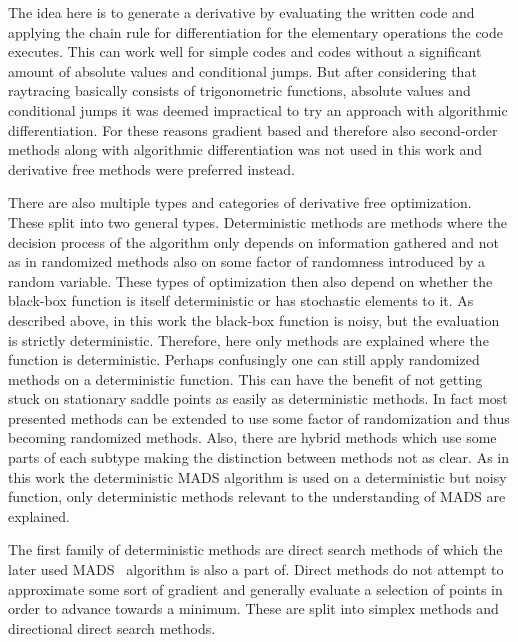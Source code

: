 \documentclass[a4paper,10pt]{article}
\begin{document}
    The idea here is to generate a derivative by evaluating the
    written code and applying the chain rule for differentiation
    for the elementary operations the code executes.
    This can work well for simple codes and codes without a
    significant amount of absolute values and conditional jumps.
    But after considering that raytracing basically consists of
    trigonometric functions, absolute values and conditional jumps
    it was deemed impractical to try an approach with algorithmic
    differentiation.
    For these reasons gradient based and therefore also second-order
    methods along with algorithmic differentiation was not used in
    this work and derivative free methods were preferred instead.

    There are also multiple types and categories of derivative
    free optimization.
    These split into two general types.
    Deterministic methods are methods where the decision process of
    the algorithm only depends on information gathered and not
    as in randomized methods also on some factor of randomness
    introduced by a random variable.
    These types of optimization then also depend on whether the
    black-box function is itself deterministic or has stochastic
    elements to it.
    As described above, in this work the black-box function is
    noisy, but the evaluation is strictly deterministic.
    Therefore, here only methods are explained where the function
    is deterministic.
    Perhaps confusingly one can still apply randomized methods on
    a deterministic function.
    This can have the benefit of not getting stuck on stationary
    saddle points as easily as deterministic methods.
    In fact most presented methods can be extended to use some
    factor of randomization and thus becoming randomized
    methods.
    Also, there are hybrid methods which use some parts of
    each subtype making the distinction between methods not
    as clear.
    As in this work the deterministic MADS algorithm is used on
    a deterministic but noisy function, only
    deterministic methods relevant to the understanding of
    MADS are explained.
    
    The first family of deterministic methods are direct search methods of which
    the later used MADS~\cite{mads_original} algorithm is also a 
    part of.
    Direct methods do not attempt to approximate some sort of gradient
    and generally evaluate a selection of points in order to advance
    towards a minimum.
    These are split into simplex methods and directional direct
    search methods.
    
\end{document}
